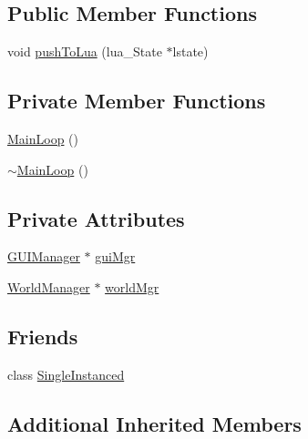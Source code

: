 \subsection*{Public Member Functions}
\begin{DoxyCompactItemize}
\item 
void \hyperlink{classZeta_1_1MainLoop_a6acb380569713fbfce0304cc5747a91d}{push\+To\+Lua} (lua\+\_\+\+State $\ast$lstate)
\end{DoxyCompactItemize}
\subsection*{Private Member Functions}
\begin{DoxyCompactItemize}
\item 
\hyperlink{classZeta_1_1MainLoop_af8d0ff54f5ea9122bd19274466a49993}{Main\+Loop} ()
\item 
\hyperlink{classZeta_1_1MainLoop_a2aa4c89baf062ad717e0de366b8421e6}{$\sim$\+Main\+Loop} ()
\end{DoxyCompactItemize}
\subsection*{Private Attributes}
\begin{DoxyCompactItemize}
\item 
\hyperlink{classZeta_1_1GUIManager}{G\+U\+I\+Manager} $\ast$ \hyperlink{classZeta_1_1MainLoop_a64ee8d94a5b467c5b25bfc77268e268e}{gui\+Mgr}
\item 
\hyperlink{classZeta_1_1WorldManager}{World\+Manager} $\ast$ \hyperlink{classZeta_1_1MainLoop_aa971c465639f0d7c7a8499706d002004}{world\+Mgr}
\end{DoxyCompactItemize}
\subsection*{Friends}
\begin{DoxyCompactItemize}
\item 
class \hyperlink{classZeta_1_1MainLoop_a2fa95d69b32a77fffa4b730679a8b08c}{Single\+Instanced}
\end{DoxyCompactItemize}
\subsection*{Additional Inherited Members}


